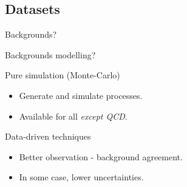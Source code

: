 %

%

\subsection*{Datasets}
%

\begin{frame}
\begin{center}
\LARGE Backgrounds?
\end{center}
\end{frame}
\addtocounter{framenumber}{-1}



\begin{frame}
\begin{center}
\Large Backgrounds modelling?
\end{center}

\begin{minipage}[t]{.45\textwidth}
\begin{block}{Pure simulation (Monte-Carlo)}
\begin{itemize}
\item Generate and simulate processes.
\item Available for all \emph{except QCD}.
\end{itemize}
\end{block}
\end{minipage}
\hfill
\begin{minipage}[t]{.45\textwidth}
\begin{block}{Data-driven techniques}
\begin{itemize}
\item Better observation - background agreement.
\item In some case, lower uncertainties.
\end{itemize}
\end{block}
\end{minipage}
\end{frame}

